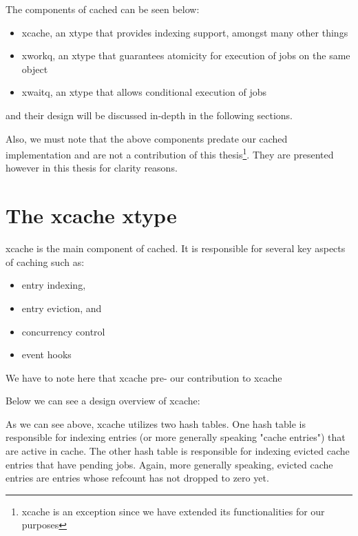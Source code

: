 The components of cached can be seen below:
 
\begin{itemize}
	\item xcache, an xtype that provides indexing support, amongst many 
		other things
	\item xworkq, an xtype that guarantees atomicity for execution of jobs 
		on the same object
	\item xwaitq, an xtype that allows conditional execution of jobs
\end{itemize}

and their design will be discussed in-depth in the following sections.

Also, we must note that the above components predate our cached implementation 
and are not a contribution of this thesis\footnote{xcache is an exception since 
	we have extended its functionalities for our purposes}. They are 
presented however in this thesis for clarity reasons. 

\section{The xcache xtype}\label{sec:xcache-design}

xcache is the main component of cached. It is responsible for several key 
aspects of caching such as:

\begin{itemize}
	\item entry indexing,
	\item entry eviction, and
	\item concurrency control
	\item event hooks
\end{itemize}

We have to note here that xcache pre- our contribution to xcache 

Below we can see a design overview of xcache:


As we can see above, xcache utilizes two hash tables. One hash table is 
responsible for indexing entries (or more generally speaking "cache entries") 
that are active in cache.  The other hash table is responsible for indexing 
evicted cache entries that have pending jobs.  Again, more generally speaking, 
evicted cache entries are entries whose refcount has not dropped to zero yet.

